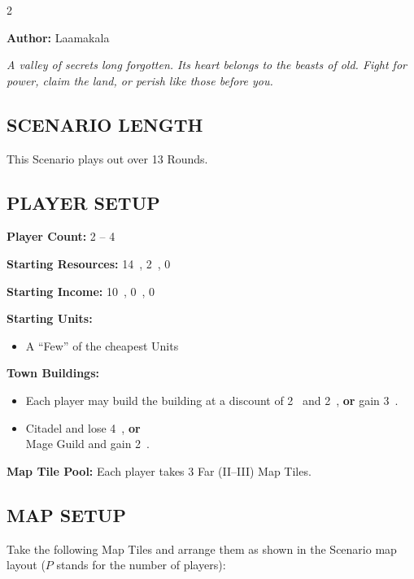 
\begin{multicols*}{2}

\textbf{Author:} Laamakala

\textit{A valley of secrets long forgotten. Its heart belongs to the beasts of old. Fight for power, claim the land, or perish like those before you.}

\subsection*{\MakeUppercase{Scenario Length}}
This Scenario plays out over 13 Rounds.

\subsection*{\MakeUppercase{Player Setup}}
\textbf{Player Count:} 2 -- 4

\textbf{Starting Resources:} 14~, 2~, 0~

\textbf{Starting Income:} 10~, 0~, 0~

\textbf{Starting Units:}

\begin{itemize}
  \item A ``Few'' of the cheapest  Units
\end{itemize}

\textbf{Town Buildings:}
\begin{itemize}
  \item Each player may build the  building at a discount of 2~ and 2~, \textbf{or} gain 3~.
  \item Citadel and lose 4~, \textbf{or} \\
    Mage Guild and gain 2~.
\end{itemize}

\textbf{Map Tile Pool:} Each player takes 3 Far (II–III) Map Tiles.

\subsection*{\MakeUppercase{Map Setup}}
Take the following Map Tiles and arrange them as shown in the Scenario map layout ($P$ stands for the number of players):


\end{multicols*}
